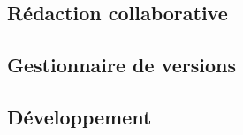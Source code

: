 \subsection{Rédaction collaborative}


\subsection{Gestionnaire de versions}


\subsection{Développement}
